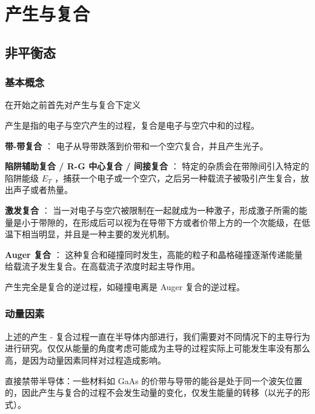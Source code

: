 \documentclass[cn,11pt,chinese,black,simple]{../elegantbook}
\begin{document}
\fi 

\chapter{产生与复合}

\section{非平衡态}

\subsection{基本概念}

在开始之前首先对产生与复合下定义 

\begin{definition}[产生与复合]
    产生是指的电子与空穴产生的过程，复合是电子与空穴中和的过程。
\end{definition}

\textbf{带-带复合} ： 电子从导带跌落到价带和一个空穴复合，并且产生光子。

\textbf{陷阱辅助复合 / R-G 中心复合 / 间接复合} ： 特定的杂质会在带隙间引入特定的陷阱能级 \(E_T\) ，捕获一个电子或一个空穴，之后另一种载流子被吸引产生复合，放出声子或者热量。

\textbf{激发复合} ： 当一对电子与空穴被限制在一起就成为一种激子，形成激子所需的能量是小于带隙的，在形成后可以视为在导带下方或者价带上方的一个次能级，在低温下相当明显，并且是一种主要的发光机制。

\textbf{Auger 复合} ： 这种复合和碰撞同时发生，高能的粒子和晶格碰撞逐渐传递能量给载流子发生复合。在高载流子浓度时起主导作用。


产生完全是复合的逆过程，如碰撞电离是 Auger 复合的逆过程。


\subsection{动量因素}

上述的产生 - 复合过程一直在半导体内部进行，我们需要对不同情况下的主导行为进行研究。仅仅从能量的角度考虑可能成为主导的过程实际上可能发生率没有那么高，是因为动量因素同样对过程造成影响。

直接禁带半导体：一些材料如 GaAs 的价带与导带的能谷是处于同一个波矢位置的，因此产生与复合的过程不会发生动量的变化，仅发生能量的转移（以光子的形式）。
\end{document}
